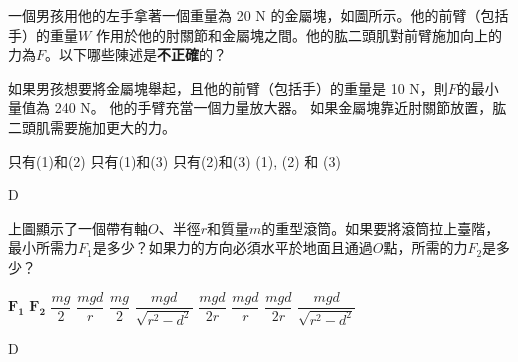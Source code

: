{
     \bigskip
    一個男孩用他的左手拿著一個重量為 20 N 的金屬塊，如圖所示。他的前臂（包括手）的重量$W$ 作用於他的肘關節和金屬塊之間。他的肱二頭肌對前臂施加向上的力為$F$。以下哪些陳述是\textbf{不正確}的？
    \begin{statements}
        \task 如果男孩想要將金屬塊舉起，且他的前臂（包括手）的重量是 10 N，則$F$的最小量值為 240 N。
        \task 他的手臂充當一個力量放大器。
        \task 如果金屬塊靠近肘關節放置，肱二頭肌需要施加更大的力。
    \end{statements}
    \begin{tasks}
        \task 只有(1)和(2)
        \task 只有(1)和(3)
        \task 只有(2)和(3)
        \task (1), (2) 和 (3)
    \end{tasks}
}{D}

{
     \par\bigskip
    上圖顯示了一個帶有軸$O$、半徑$r$和質量$m$的重型滾筒。如果要將滾筒拉上臺階，最小所需力$F_1$是多少？如果力的方向必須水平於地面且通過$O$點，所需的力$F_2$是多少？
    \begin{tasks}
        \task [] $\mathbf{F_1}$ \tab\tab $\mathbf{F_2}$\vspace{.8em}
        \task $\dfrac{mg}{2}$ \tab\tab $\dfrac{mgd}{r}$
        \task $\dfrac{mg}{2}$ \tab\tab $\dfrac{mgd}{\sqrt{r^2-d^2}}$
        \task $\dfrac{mgd}{2r}$ \tab\tab $\dfrac{mgd}{r}$
        \task $\dfrac{mgd}{2r}$ \tab\tab $\dfrac{mgd}{\sqrt{r^2-d^2}}$
    \end{tasks}

}{D}